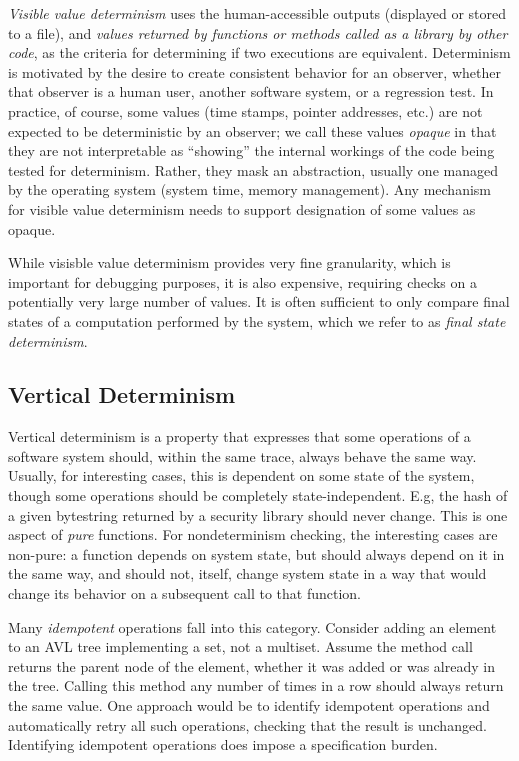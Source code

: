 \emph{Visible value determinism} uses the human-accessible outputs (displayed
or stored to a file), and \emph{values returned by functions or methods
called as a library by other code}, as the criteria for determining if two executions
are equivalent.  Determinism is motivated by the
desire to create consistent behavior for an observer, whether that
observer is a human user, another software system, or a regression
test.  In practice, of course, some values (time
stamps, pointer addresses, etc.) are not expected to be deterministic
by an observer; we call these values \emph{opaque} in that they are
not interpretable as ``showing'' the internal workings of the code
being tested for determinism.  Rather, they mask an abstraction,
usually one managed by the operating system (system
time, memory management).   Any mechanism for visible value
determinism needs to support designation of some
values as opaque.

While visisble value determinism provides very fine granularity, which
is important for debugging purposes, it is also expensive, requiring
checks on a potentially very large number of values.  It is often
sufficient to only compare final states of a computation performed by
the system, which we refer to as \emph{final state determinism}.



\subsection{Vertical Determinism}

Vertical determinism is a property that expresses that some operations
of a software system should, within the same trace, always behave the
same way.  Usually, for interesting cases, this is dependent on some
state of the system, though some operations should be completely
state-independent.  E.g, the hash of a given bytestring returned by a
security library should never change.  This is one aspect of
\emph{pure} functions.  For nondeterminism checking, the interesting
cases are non-pure: a function depends on system state, but should
always depend on it in the same way, and should not, itself, change
system state in a way that would change its behavior on a subsequent
call to that function.

Many \emph{idempotent} operations fall into this category.
Consider adding an element to an AVL tree implementing a set, not a
multiset.  Assume the method call returns the parent node of the
element, whether it was added or was already in the tree.  Calling
this method any number of times in a row should always return the
same value.  One approach would be to identify
idempotent operations and 
automatically retry all such operations, checking that the
result is unchanged.  Identifying idempotent operations does impose a specification burden.

